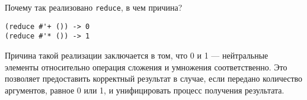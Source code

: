 
Почему так реализовано \verb|reduce|, в чем причина?

\begin{verbatim}
(reduce #'+ ()) -> 0
(reduce #'* ()) -> 1
\end{verbatim}

Причина такой реализации заключается в том, что 0 и 1 --- нейтральные элементы
относительно операция сложения и умножения соответственно. Это позволяет
предоставить корректный результат в случае, если передано количество аргументов,
равное 0 или 1, и унифицировать процесс получения результата.

